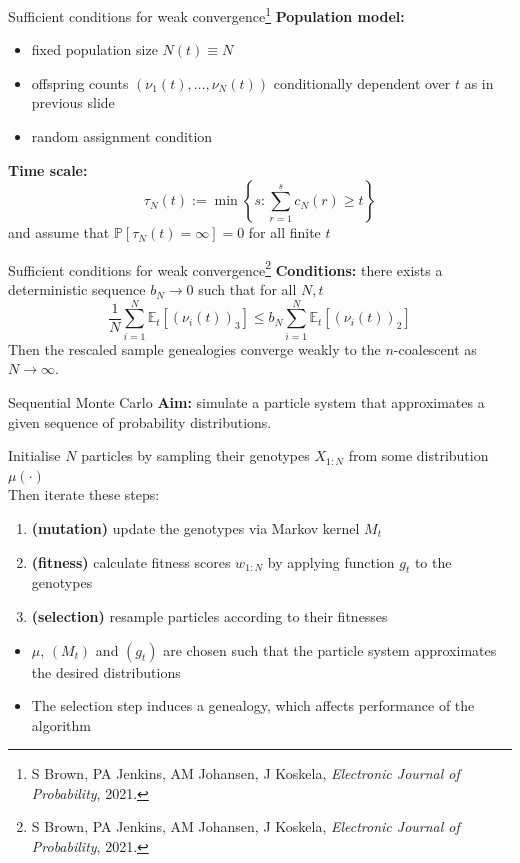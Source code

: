 \documentclass[aspectratio=169,fleqn]{beamer}
\theoremstyle{definition}
\newcommand{\Prob}{\mathbb{P}}
\newcommand{\Et}{\mathbb{E}_{t}}
\begin{document}
\begin{frame}{Sufficient conditions for weak convergence\footnote[frame]{S Brown, PA Jenkins, AM Johansen, J Koskela, \textit{Electronic Journal of Probability}, 2021.}}
	\textbf{Population model:}
	\begin{itemize}
		\item fixed population size $N(t) \equiv N$
		\item offspring counts $(\nu_1(t), \dots, \nu_N(t))$ conditionally dependent over $t$ as in previous slide
		\item random assignment condition
	\end{itemize}
	\pause
	\textbf{Time scale:}
	\begin{equation*}
	\tau_N(t) := \min \left\{ s: \sum_{r=1}^s c_N(r) \geq t \right\}
	\end{equation*}
	and assume that $\Prob[\tau_N(t) = \infty] =0$ for all finite $t$ 
\end{frame}
\addtocounter{footnote}{-1}
\begin{frame}{Sufficient conditions for weak convergence\footnote[frame]{S Brown, PA Jenkins, AM Johansen, J Koskela, \textit{Electronic Journal of Probability}, 2021.}}
	\textbf{Conditions:} there exists a deterministic sequence $b_N \to 0$ such that for all $N,t$
	\begin{equation*}
	\frac{1}{N} \sum_{i=1}^N \Et[ (\nu_i(t))_3 ] \leq b_N  \sum_{i=1}^N \Et[ (\nu_i(t))_2 ]
	\end{equation*}
	\pause
	Then the rescaled sample genealogies converge weakly to the $n$-coalescent as $N\to\infty$.
\end{frame}


\begin{frame}{Sequential Monte Carlo}
	\textbf{Aim:} simulate a particle system that approximates a given sequence of probability distributions.\\
	\vspace{10pt}
	
	\pause
	Initialise $N$ particles by sampling their genotypes $X_{1:N}$ from some distribution $\mu(\cdot)$\\[5pt]
	
	Then iterate these steps:
	\begin{enumerate}
	\item \textbf{(mutation)} update the genotypes via Markov kernel $M_t$
	\item \textbf{(fitness)} calculate fitness scores $w_{1:N}$ by applying function $g_t$ to the genotypes
	\item \textbf{(selection)} resample particles according to their fitnesses
	\end{enumerate}
	\vspace{10pt}
	
	\pause
	\begin{itemize}
	\item $\mu$, $(M_t)$ and $(g_t)$ are chosen such that the particle system approximates the desired distributions
	\item The selection step induces a genealogy, which affects performance of the algorithm
	\end{itemize}
\end{frame}
\end{document}
